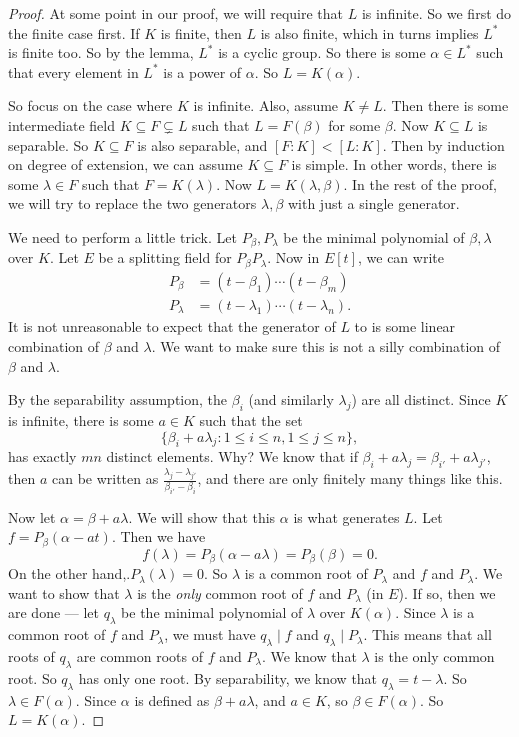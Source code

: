 \documentclass[a4paper]{article}
\begin{document}
\begin{proof}
  At some point in our proof, we will require that $L$ is infinite. So we first do the finite case first. If $K$ is finite, then $L$ is also finite, which in turns implies $L^*$ is finite too. So by the lemma, $L^*$ is a cyclic group. So there is some $\alpha \in L^*$ such that every element in $L^*$ is a power of $\alpha$. So $L = K(\alpha)$.

  So focus on the case where $K$ is infinite. Also, assume $K \not= L$. Then there is some intermediate field $K\subseteq F\subsetneq L$ such that $L = F(\beta)$ for some $\beta$. Now $K\subseteq L$ is separable. So $K\subseteq F$ is also separable, and $[F:K] < [L:K]$. Then by induction on degree of extension, we can assume $K\subseteq F$ is simple. In other words, there is some $\lambda \in F$ such that $F = K(\lambda)$. Now $L = K(\lambda, \beta)$. In the rest of the proof, we will try to replace the two generators $\lambda, \beta$ with just a single generator.

  We need to perform a little trick. Let $P_\beta, P_\lambda$ be the minimal polynomial of $\beta, \lambda$ over $K$. Let $E$ be a splitting field for $P_\beta P_\lambda$. Now in $E[t]$, we can write
  \begin{align*}
    P_\beta &= (t - \beta_1)\cdots (t - \beta_m)\\
    P_\lambda &= (t - \lambda_1) \cdots (t - \lambda_n).
  \end{align*}
  It is not unreasonable to expect that the generator of $L$ to is some linear combination of $\beta$ and $\lambda$. We want to make sure this is not a silly combination of $\beta$ and $\lambda$.

  By the separability assumption, the $\beta_i$ (and similarly $\lambda_j$) are all distinct. Since $K$ is infinite, there is some $a \in K$ such that the set
  \[
    \{\beta_i + a \lambda_j: 1 \leq i \leq n, 1 \leq j \leq n\},
  \]
  has exactly $mn$ distinct elements. Why? We know that if $\beta_i + a \lambda_j = \beta_{i'} + a \lambda_{j'}$, then $a$ can be written as $\frac{\lambda_j - \lambda_{j'}}{\beta_{i'} - \beta_i}$, and there are only finitely many things like this.

  Now let $\alpha = \beta + a \lambda$. We will show that this $\alpha$ is what generates $L$. Let $f = P_\beta(\alpha - at)$. Then we have
  \[
    f(\lambda) = P_\beta(\alpha - a\lambda) = P_\beta(\beta) = 0.
  \]
  On the other hand,.$P_\lambda(\lambda) = 0$. So $\lambda$ is a common root of $P_\lambda$ and $f$ and $P_\lambda$. We want to show that $\lambda$ is the \emph{only} common root of $f$ and $P_\lambda$ (in $E$). If so, then we are done --- let $q_\lambda$ be the minimal polynomial of $\lambda$ over $K(\alpha)$. Since $\lambda$ is a common root of $f$ and $P_\lambda$, we must have $q_\lambda \mid f$ and $q_\lambda \mid P_\lambda$. This means that all roots of $q_\lambda$ are common roots of $f$ and $P_\lambda$. We know that $\lambda$ is the only common root. So $q_\lambda$ has only one root. By separability, we know that $q_\lambda = t - \lambda$. So $\lambda \in F(\alpha)$. Since $\alpha$ is defined as $\beta + a \lambda$, and $a \in K$, so $\beta\in F(\alpha)$. So $L = K(\alpha)$.


\end{proof}
\end{document}
